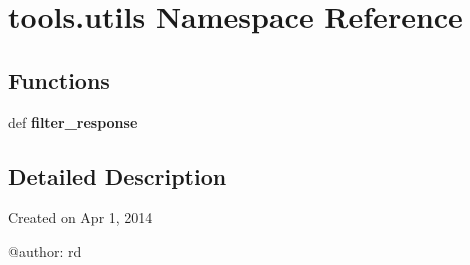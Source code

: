 \hypertarget{namespacetools_1_1utils}{\section{tools.\-utils Namespace Reference}
\label{namespacetools_1_1utils}
}
\subsection*{Functions}
\begin{DoxyCompactItemize}
\item 
\hypertarget{namespacetools_1_1utils_ad877affa1c26e47a0d135a019c1acd50}{def {\bfseries filter\-\_\-response}}\label{namespacetools_1_1utils_ad877affa1c26e47a0d135a019c1acd50}

\end{DoxyCompactItemize}


\subsection{Detailed Description}
\begin{DoxyVerb}Created on Apr 1, 2014

@author: rd
\end{DoxyVerb}
 